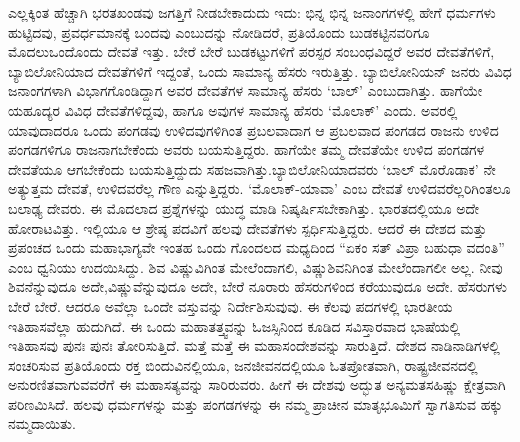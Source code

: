 ಎಲ್ಲಕ್ಕಿಂತ ಹೆಚ್ಚಾಗಿ ಭರತಖಂಡವು ಜಗತ್ತಿಗೆ ನೀಡಬೇಕಾದುದು ಇದು: ಭಿನ್ನ ಭಿನ್ನ ಜನಾಂಗಗಳಲ್ಲಿ ಹೇಗೆ ಧರ್ಮಗಳು ಹುಟ್ಟಿದವು, ಪ್ರವರ್ಧ\-ಮಾನಕ್ಕೆ ಬಂದವು ಎಂಬುದನ್ನು ನೋಡಿದರೆ, ಪ್ರತಿಯೊಂದು ಬುಡಕಟ್ಟಿನವರಿಗೂ ಮೊದಲು\break ಒಂದೊಂದು ದೇವತೆ ಇತ್ತು. ಬೇರೆ ಬೇರೆ ಬುಡಕಟ್ಟುಗಳಿಗೆ ಪರಸ್ಪರ ಸಂಬಂಧವಿದ್ದರೆ ಅವರ ದೇವತೆಗಳಿಗೆ, ಬ್ಯಾಬಿಲೋನಿಯಾದ ದೇವತೆಗಳಿಗೆ ಇದ್ದಂತೆ, ಒಂದು ಸಾಮಾನ್ಯ ಹೆಸರು ಇರುತ್ತಿತ್ತು. ಬ್ಯಾಬಿಲೋನಿಯನ್​ ಜನರು ವಿವಿಧ ಜನಾಂಗಗಳಾಗಿ ವಿಭಾಗಗೊಂಡಿದ್ದಾಗ ಅವರ ದೇವತೆಗಳ ಸಾಮಾನ್ಯ ಹೆಸರು ‘ಬಾಲ್​’ ಎಂಬುದಾಗಿತ್ತು. ಹಾಗೆಯೇ ಯಹೂದ್ಯರ ವಿವಿಧ ದೇವತೆಗಳಿದ್ದವು, ಹಾಗೂ ಅವುಗಳ ಸಾಮಾನ್ಯ ಹೆಸರು ‘ಮೊಲಾಕ್​’ ಎಂದು. ಅವರಲ್ಲಿ ಯಾವುದಾದರೂ ಒಂದು ಪಂಗಡವು ಉಳಿದವುಗಳಿಗಿಂತ ಪ್ರಬಲವಾದಾಗ ಆ ಪ್ರಬಲವಾದ ಪಂಗಡದ ರಾಜನು ಉಳಿದ ಪಂಗಡಗಳಿಗೂ ರಾಜನಾಗಬೇಕೆಂದು ಅವರು ಬಯಸುತ್ತಿದ್ದರು. ಹಾಗೆಯೇ ತಮ್ಮ ದೇವತೆಯೇ ಉಳಿದ ಪಂಗಡಗಳ ದೇವತೆಯೂ ಆಗಬೇಕೆಂದು ಬಯಸುತ್ತಿದ್ದುದು ಸಹಜವಾಗಿತ್ತು.\break ಬ್ಯಾಬಿಲೋನಿಯಾದವರು ‘ಬಾಲ್​ ಮೊರೊಡಾಕ’ ನೇ ಅತ್ಯುತ್ತಮ ದೇವತೆ, ಉಳಿದವರೆಲ್ಲ ಗೌಣ ಎನ್ನುತ್ತಿದ್ದರು. ‘ಮೊಲಾಕ್​-ಯಾವಾ’ ಎಂಬ ದೇವತೆ ಉಳಿದವರೆಲ್ಲರಿಗಿಂತಲೂ ಬಲಾಢ್ಯ ದೇವರು. ಈ ಮೊದಲಾದ ಪ್ರಶ್ನೆಗಳನ್ನು ಯುದ್ಧ ಮಾಡಿ ನಿಷ್ಕರ್ಷಿಸಬೇಕಾಗಿತ್ತು. ಭಾರತದಲ್ಲಿಯೂ ಅದೇ ಹೋರಾಟವಿತ್ತು. ಇಲ್ಲಿಯೂ ಆ ಶ್ರೇಷ್ಠ ಪದವಿಗೆ ಹಲವು ದೇವತೆಗಳು ಸ್ಪರ್ಧಿಸುತ್ತಿದ್ದರು. ಆದರೆ ಈ ದೇಶದ ಮತ್ತು ಪ್ರಪಂಚದ ಒಂದು ಮಹಾಭಾಗ್ಯವೇ ಇಂತಹ ಒಂದು ಗೊಂದಲದ ಮಧ್ಯದಿಂದ “ಏಕಂ ಸತ್​ ವಿಪ್ರಾ ಬಹುಧಾ ವದಂತಿ” ಎಂಬ ಧ್ವನಿಯು ಉದಯಿಸಿದ್ದು. ಶಿವ ವಿಷ್ಣುವಿಗಿಂತ ಮೇಲೆಂದಾಗಲಿ, ವಿಷ್ಣು\break ಶಿವನಿಗಿಂತ ಮೇಲೆಂದಾಗಲೀ ಅಲ್ಲ. ನೀವು ಶಿವನೆನ್ನುವುದೂ ಅದೇ,\break ವಿಷ್ಣುವೆನ್ನುವುದೂ ಅದೇ, ಬೇರೆ ನೂರಾರು ಹೆಸರುಗಳಿಂದ ಕರೆಯುವುದೂ ಅದೇ. ಹೆಸರುಗಳು ಬೇರೆ ಬೇರೆ. ಆದರೂ ಅವೆಲ್ಲಾ ಒಂದೇ ವಸ್ತುವನ್ನು ನಿರ್ದೇಶಿಸುವುವು. ಈ ಕೆಲವು ಪದಗಳಲ್ಲಿ ಭಾರತೀಯ ಇತಿಹಾಸವೆಲ್ಲಾ ಹುದುಗಿದೆ. ಈ ಒಂದು ಮಹಾತತ್ತ್ವವನ್ನು ಓಜಸ್ಸಿನಿಂದ ಕೂಡಿದ ಸವಿಸ್ತಾರವಾದ ಭಾಷೆಯಲ್ಲಿ ಇತಿಹಾಸವು ಪುನಃ ಪುನಃ ತೋರಿಸುತ್ತಿದೆ. ಮತ್ತೆ ಮತ್ತೆ ಈ ಮಹಾಸಂದೇಶವನ್ನು ಸಾರುತ್ತಿದೆ. ದೇಶದ ನಾಡಿನಾಡಿಗಳಲ್ಲಿ ಸಂಚರಿಸುವ ಪ್ರತಿಯೊಂದು ರಕ್ತ ಬಿಂದುವಿನಲ್ಲಿಯೂ, ಜನಜೀವನದಲ್ಲಿಯೂ ಓತಪ್ರೋತವಾಗಿ, ರಾಷ್ಟ್ರಜೀವನದಲ್ಲಿ ಅನುರಣಿತವಾಗುವವರೆಗೆ ಈ ಮಹಾಸತ್ಯವನ್ನು ಸಾರಿರುವರು. ಹೀಗೆ ಈ ದೇಶವು ಅದ್ಭುತ ಅನ್ಯಮತಸಹಿಷ್ಣು ಕ್ಷೇತ್ರವಾಗಿ ಪರಿಣಮಿಸಿದೆ. ಹಲವು ಧರ್ಮಗಳನ್ನು ಮತ್ತು ಪಂಗಡಗಳನ್ನು ಈ ನಮ್ಮ ಪ್ರಾಚೀನ ಮಾತೃಭೂಮಿಗೆ ಸ್ವಾಗತಿಸುವ ಹಕ್ಕು ನಮ್ಮದಾಯಿತು.

